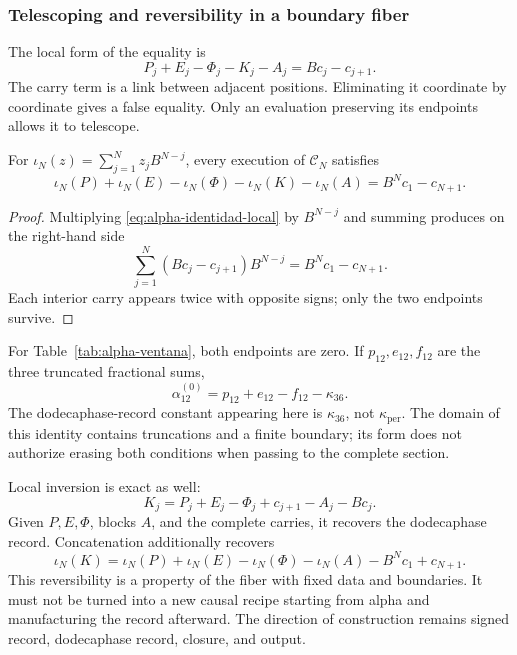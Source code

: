 \subsubsection{Telescoping and reversibility in a boundary fiber}
\label{subsec:alpha-telescopia}

The local form of the equality is
\begin{equation}
 P_j+E_j-\Phi_j-K_j-A_j=Bc_j-c_{j+1}.
 \label{eq:alpha-identidad-local}
\end{equation}
The carry term is a link between adjacent positions. Eliminating it
coordinate by coordinate gives a false equality. Only an
evaluation preserving its endpoints allows it to telescope.

\begin{proposition}
\label{prop:alpha-telescopia}
For \(\iota_N(z)=\sum_{j=1}^{N}z_jB^{N-j}\), every execution of
\(\mathcal C_N\) satisfies
\begin{equation}
 \iota_N(P)+\iota_N(E)-\iota_N(\Phi)-\iota_N(K)-\iota_N(A)
 =B^Nc_1-c_{N+1}.
 \label{eq:alpha-telescopia}
\end{equation}
\end{proposition}

\begin{proof}
Multiplying \eqref{eq:alpha-identidad-local} by \(B^{N-j}\) and summing
produces on the right-hand side
\[
 \sum_{j=1}^{N}(Bc_j-c_{j+1})B^{N-j}=B^Nc_1-c_{N+1}.
\]
Each interior carry appears twice with opposite signs; only
the two endpoints survive.
\end{proof}

For Table~\ref{tab:alpha-ventana}, both endpoints are zero. If
\(p_{12},e_{12},f_{12}\) are the three truncated fractional sums,
\[
 \alpha_{12}^{(0)}=p_{12}+e_{12}-f_{12}-\kappa_{36}.
\]
The dodecaphase-record constant appearing here is \(\kappa_{36}\), not
\(\kappa_{\mathrm{per}}\). The domain of this identity contains
truncations and a finite boundary; its form does not authorize erasing both
conditions when passing to the complete section.

Local inversion is exact as well:
\[
 K_j=P_j+E_j-\Phi_j+c_{j+1}-A_j-Bc_j.
\]
Given \(P,E,\Phi\), blocks \(A\), and the complete carries,
it recovers the dodecaphase record. Concatenation additionally recovers
\[
 \iota_N(K)=\iota_N(P)+\iota_N(E)-\iota_N(\Phi)-\iota_N(A)
             -B^Nc_1+c_{N+1}.
\]
This reversibility is a property of the fiber with fixed data and
boundaries. It must not be turned into a new causal recipe starting from
alpha and manufacturing the record afterward. The direction of construction remains
signed record, dodecaphase record, closure, and output.

